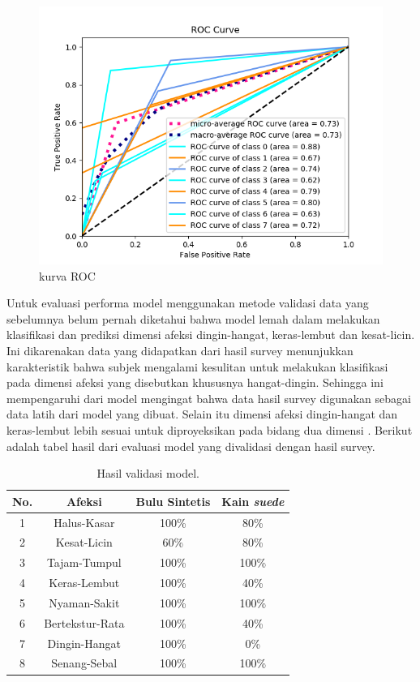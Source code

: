 \documentclass{Jurnal_kolo}
\begin{document}
\begin{multicols}{2}
		\begin{figure}[H]
			\centering
			\includegraphics[scale=0.5]{gambar/roc}
			\caption{kurva ROC}
			\label{roc1}
		\end{figure}
	
	\indent Untuk evaluasi performa model menggunakan metode validasi data yang sebelumnya belum pernah diketahui bahwa model lemah dalam melakukan klasifikasi dan prediksi dimensi afeksi dingin-hangat, keras-lembut dan kesat-licin. Ini dikarenakan data yang didapatkan dari hasil survey menunjukkan karakteristik bahwa subjek mengalami kesulitan untuk melakukan klasifikasi pada dimensi afeksi yang disebutkan khususnya hangat-dingin. Sehingga ini mempengaruhi dari model mengingat bahwa data hasil survey digunakan sebagai data latih dari model yang dibuat. Selain itu dimensi afeksi dingin-hangat dan keras-lembut lebih sesuai untuk diproyeksikan pada bidang dua dimensi \cite{Picard2003}. Berikut adalah tabel hasil dari evaluasi model yang divalidasi dengan hasil survey.\\
	
		\begin{table}[H]
		\centering
		\caption{Hasil validasi model.}
		\label{val-mod1}
		\begin{tabular}{|c|c|c|c|}
			\hline
			No.& Afeksi &Bulu Sintetis & Kain \emph{suede}\\
			\hline
			1 & Halus-Kasar& 100\% & 80\% \\
			\hline
			2 & Kesat-Licin & 60\% & 80\% \\
			\hline
			3 & Tajam-Tumpul & 100\% & 100\% \\
			\hline
			4 & Keras-Lembut & 100\% & 40\% \\
			\hline
			5 & Nyaman-Sakit & 100\% & 100\% \\
			\hline
			6 & Bertekstur-Rata & 100\% & 40\% \\
			\hline
			7 & Dingin-Hangat& 100\% & 0\% \\
			\hline
			8 & Senang-Sebal& 100\% & 100\% \\
			\hline
			

\end{tabular}
\end{table}
\end{multicols}
\end{document}
